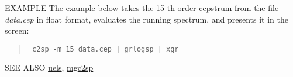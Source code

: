\begin{options}
\end{options}

\begin{qsection}{EXAMPLE}
The example below takes the 15-th order cepstrum from the file
 {\em data.cep} in float format, evaluates the running spectrum,
 and presents it in the screen:
\begin{quote}
 \verb! c2sp -m 15 data.cep | grlogsp | xgr ! 
\end{quote}
\end{qsection}

\begin{qsection}{SEE ALSO}
\hyperlink{uels}{uels},
\hyperlink{mgc2sp}{mgc2sp}
\end{qsection}
